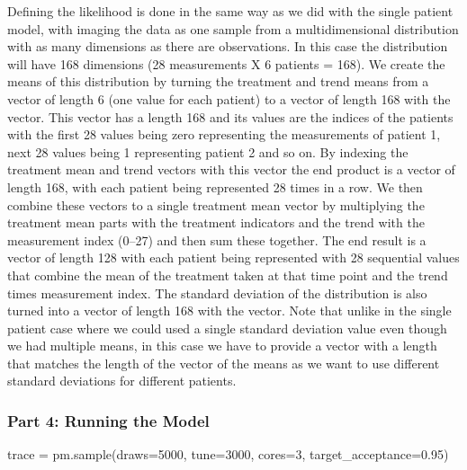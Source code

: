 \documentclass[12pt,a4paper,leqno]{report}
\theoremstyle{plain}
\theoremstyle{definition}
\theoremstyle{remark}
\begin{document}
Defining the likelihood is done in the same way as we did with the single patient model,
with imaging the data as one sample from a multidimensional distribution with as many
dimensions as there are observations. In this case the
distribution will have 168 dimensions (28 measurements X 6 patients = 168). We
create the means of this distribution by turning the treatment and trend means from
a vector of length 6 (one value for each patient) to a vector of length 168 with the
 vector. This vector has a length 168 and its values are the indices of the
patients with the first 28 values being
zero representing the measurements of patient 1, next 28 values being 1 representing
patient 2 and so on. By indexing the treatment mean and trend vectors with this vector the end
product is a vector of length 168, with each patient being represented 28 times
in a row. We then combine these vectors to a single treatment mean vector by multiplying
the treatment mean parts with the treatment indicators and the trend with the
measurement index (0--27) and then sum these together. The end result is a
vector of length 128 with each patient being represented with 28 sequential values that
combine the mean of the treatment taken at that time point and the trend times measurement index. The standard
deviation of the distribution is also turned into a vector of length 168 with the
 vector. Note that unlike in the single patient case where we could used a single
standard deviation value even though we had multiple means, in this case we have to
provide a vector with a length that matches the length of the vector of the means as we
want to use different standard deviations for different patients.

\subsubsection*{Part 4: Running the Model}

\bigskip
\begin{pyverbatim}[][fontsize=\footnotesize]
    trace = pm.sample(draws=5000, tune=3000, cores=3, target_acceptance=0.95)
\end{pyverbatim}
\bigskip
\end{document}

